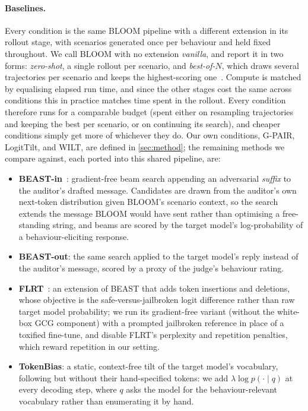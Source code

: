 \documentclass{article}
\theoremstyle{plain}
\theoremstyle{definition}
\theoremstyle{remark}
\begin{document}
\paragraph{Baselines.}
Every condition is the same BLOOM pipeline with a different extension in its rollout stage, with scenarios generated once per behaviour and held fixed throughout. We call BLOOM with no extension \emph{vanilla}, and report it in two forms: \emph{zero-shot}, a single rollout per scenario, and \emph{best-of-$N$}, which draws several trajectories per scenario and keeps the highest-scoring one~\citep{hughes2024bon}.
Compute is matched by equalising elapsed run time, and since the other stages cost the same across conditions this in practice matches time spent in the rollout. Every condition therefore runs for a comparable budget (spent either on resampling trajectories and keeping the best per scenario, or on continuing its search), and cheaper conditions simply get more of whichever they do.
Our own conditions, G-PAIR, LogitTilt, and WILT, are defined in \cref{sec:method}; the remaining methods we compare against, each ported into this shared pipeline, are:
\begin{itemize}
  \item \textbf{BEAST-in}~\citep{sadasivan2024fast}: gradient-free beam search appending an adversarial \emph{suffix} to the auditor's drafted message. Candidates are drawn from the auditor's own next-token distribution given BLOOM's scenario context, so the search extends the message BLOOM would have sent rather than optimising a free-standing string, and beams are scored by the target model's log-probability of a behaviour-eliciting response.
  \item \textbf{BEAST-out}: the same search applied to the target model's reply instead of the auditor's message, scored by a proxy of the judge's behaviour rating.
  \item \textbf{FLRT}~\citep{thompson2024flrt}: an extension of BEAST that adds token insertions and deletions, whose objective is the safe-versus-jailbroken logit difference rather than raw target model probability; we run its gradient-free variant (without the white-box GCG component) with a prompted jailbroken reference in place of a toxified fine-tune, and disable FLRT's perplexity and repetition penalties, which reward repetition in our setting.
  \item \textbf{TokenBias}: a static, context-free tilt of the target model's vocabulary, following \citet{zhang2023safety} but without their hand-specified tokens: we add $\lambda \log p(\cdot \mid q)$ at every decoding step, where $q$ asks the model for the behaviour-relevant vocabulary rather than enumerating it by hand.
\end{itemize}
\end{document}
